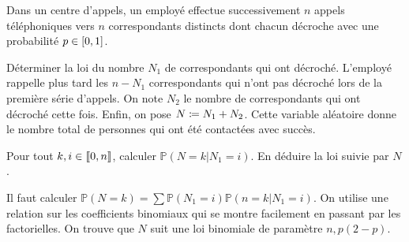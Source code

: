 \documentclass{magnolia}
\begin{document}
 Dans un centre d'appels, un employé effectue successivement $n$ appels
  téléphoniques vers $n$ correspondants distincts dont chacun décroche avec une
  probabilité $p\in\left[0,1\right]$.
  \begin{questions}
  \question Déterminer la loi du nombre $N_1$ de correspondants qui ont décroché.
  \question L'employé rappelle plus tard les $n-N_1$ correspondants qui n'ont pas décroché
    lors de la première série d'appels. On note $N_2$ le nombre de correspondants
    qui ont décroché cette fois. Enfin, on pose $N\coloneqq N_1+N_2$. Cette variable aléatoire donne
    le nombre total de personnes qui ont été contactées avec succès.
    \begin{questions}
    \question Pour tout $k,i\in\left\llbracket 0,n\right\rrbracket$, calculer $\mathbb{P}(N=k|N_1=i)$.
    \question En déduire la loi suivie par $N$.
    \end{questions}
  \end{questions}
  \begin{sol}
Il faut calculer $\mathbb{P}(N=k)=\sum \mathbb{P}(N_1=i) \mathbb{P}(n=k|N_1=i)$. On utilise une relation sur
les coefficients binomiaux qui se montre facilement en passant par les factorielles. On trouve que $N$ suit une
loi binomiale de paramètre $n,p(2-p)$.
  \end{sol}



\end{document}
